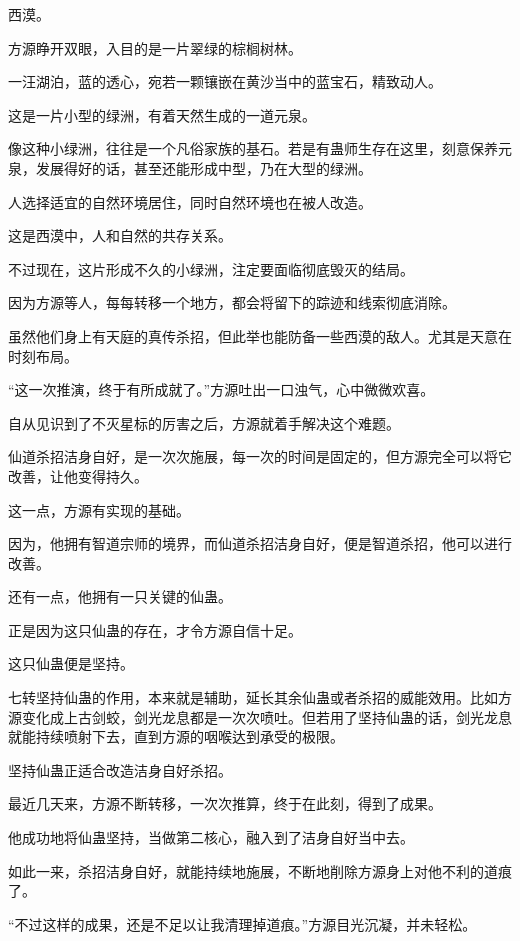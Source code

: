 
\begin{this_body}

西漠。

方源睁开双眼，入目的是一片翠绿的棕榈树林。

一汪湖泊，蓝的透心，宛若一颗镶嵌在黄沙当中的蓝宝石，精致动人。

这是一片小型的绿洲，有着天然生成的一道元泉。

像这种小绿洲，往往是一个凡俗家族的基石。若是有蛊师生存在这里，刻意保养元泉，发展得好的话，甚至还能形成中型，乃在大型的绿洲。

人选择适宜的自然环境居住，同时自然环境也在被人改造。

这是西漠中，人和自然的共存关系。

不过现在，这片形成不久的小绿洲，注定要面临彻底毁灭的结局。

因为方源等人，每每转移一个地方，都会将留下的踪迹和线索彻底消除。

虽然他们身上有天庭的真传杀招，但此举也能防备一些西漠的敌人。尤其是天意在时刻布局。

“这一次推演，终于有所成就了。”方源吐出一口浊气，心中微微欢喜。

自从见识到了不灭星标的厉害之后，方源就着手解决这个难题。

仙道杀招洁身自好，是一次次施展，每一次的时间是固定的，但方源完全可以将它改善，让他变得持久。

这一点，方源有实现的基础。

因为，他拥有智道宗师的境界，而仙道杀招洁身自好，便是智道杀招，他可以进行改善。

还有一点，他拥有一只关键的仙蛊。

正是因为这只仙蛊的存在，才令方源自信十足。

这只仙蛊便是坚持。

七转坚持仙蛊的作用，本来就是辅助，延长其余仙蛊或者杀招的威能效用。比如方源变化成上古剑蛟，剑光龙息都是一次次喷吐。但若用了坚持仙蛊的话，剑光龙息就能持续喷射下去，直到方源的咽喉达到承受的极限。

坚持仙蛊正适合改造洁身自好杀招。

最近几天来，方源不断转移，一次次推算，终于在此刻，得到了成果。

他成功地将仙蛊坚持，当做第二核心，融入到了洁身自好当中去。

如此一来，杀招洁身自好，就能持续地施展，不断地削除方源身上对他不利的道痕了。

“不过这样的成果，还是不足以让我清理掉道痕。”方源目光沉凝，并未轻松。


\end{this_body}
